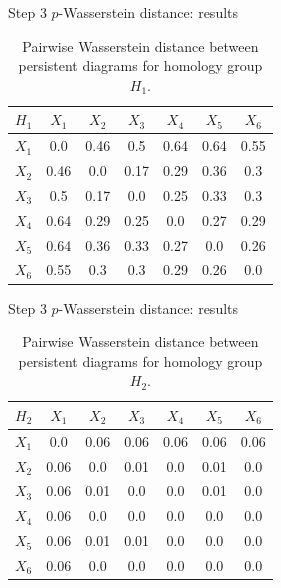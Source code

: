 \documentclass[xcolor={dvipsnames,svgnames}]{beamer}
\begin{document}
\begin{frame}{Step 3 $p$-Wasserstein distance: results}
\begin{table}[!htbp]
        \centering
        \small
        \setlength\tabcolsep{5pt}
        \begin{tabular}{|c|c|c|c|c|c|c|}
\hline
 $H_1$& $X_1$ & $X_2$ & $X_3$ & $X_4$ & $X_5$ & $X_6$ \\ \hline
$X_1$ &
0.0&
0.46&
0.5&
0.64&
0.64&
0.55

\\\hline
$X_2$ &
0.46&
0.0&
0.17&
0.29&
0.36&
0.3
\\\hline
$X_3$ &
0.5&
0.17&
0.0&
0.25&
0.33&
0.3
\\\hline 
$X_4$ &
0.64&
0.29&
0.25&
0.0&
0.27&
0.29
\\\hline 
$X_5$ &
0.64&
0.36&
0.33&
0.27&
0.0&
0.26

\\\hline
$X_6$ &
0.55&
0.3&
0.3&
0.29&
0.26&
0.0\\
\hline
\end{tabular}
\caption{Pairwise Wasserstein distance between persistent diagrams for homology group $H_1$.}
\label{tab:Wass_H1}
\end{table}
\end{frame}

\begin{frame}{Step 3 $p$-Wasserstein distance: results}
\begin{table}[!htbp]
        \centering
        \small
        \setlength\tabcolsep{5pt}
        \begin{tabular}{|c|c|c|c|c|c|c|}
\hline
 $H_2$& $X_1$ & $X_2$ & $X_3$ & $X_4$ & $X_5$ & $X_6$ \\ \hline
$X_1$ &
0.0&
0.06&
0.06&
0.06&
0.06&
0.06
\\
\hline
$X_2$ &
0.06&
0.0&
0.01&
0.0&
0.01&
0.0
\\
\hline
$X_3$ &
0.06&
0.01&
0.0&
0.0&
0.01&
0.0
\\
\hline
$X_4$ &
0.06&
0.0&
0.0&
0.0&
0.0&
0.0
\\
\hline
$X_5$ &
0.06&
0.01&
0.01&
0.0&
0.0&
0.0
\\
\hline
$X_6$ &
0.06&
0.0&
0.0&
0.0&
0.0&
0.0
\\
\hline
\end{tabular}
\caption{Pairwise Wasserstein distance between persistent diagrams for homology group $H_2$.}
\label{tab:Wass_H2}
\end{table}
\end{frame}
\end{document}
